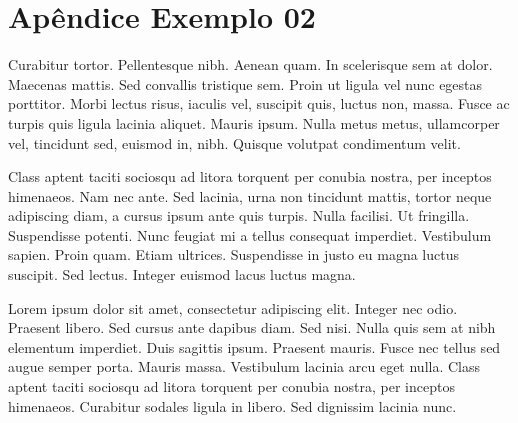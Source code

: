 \chapter{Apêndice Exemplo 02}
\noindent
Curabitur tortor. Pellentesque nibh. Aenean quam. In scelerisque sem at dolor. Maecenas mattis. Sed convallis tristique sem. Proin ut ligula vel nunc egestas porttitor. Morbi lectus risus, iaculis vel, suscipit quis, luctus non, massa. Fusce ac turpis quis ligula lacinia aliquet. Mauris ipsum. Nulla metus metus, ullamcorper vel, tincidunt sed, euismod in, nibh. Quisque volutpat condimentum velit.

Class aptent taciti sociosqu ad litora torquent per conubia nostra, per inceptos himenaeos. Nam nec ante. Sed lacinia, urna non tincidunt mattis, tortor neque adipiscing diam, a cursus ipsum ante quis turpis. Nulla facilisi. Ut fringilla. Suspendisse potenti. Nunc feugiat mi a tellus consequat imperdiet. Vestibulum sapien. Proin quam. Etiam ultrices. Suspendisse in justo eu magna luctus suscipit. Sed lectus. Integer euismod lacus luctus magna.

Lorem ipsum dolor sit amet, consectetur adipiscing elit. Integer nec odio. Praesent libero. Sed cursus ante dapibus diam. Sed nisi. Nulla quis sem at nibh elementum imperdiet. Duis sagittis ipsum. Praesent mauris. Fusce nec tellus sed augue semper porta. Mauris massa. Vestibulum lacinia arcu eget nulla. Class aptent taciti sociosqu ad litora torquent per conubia nostra, per inceptos himenaeos. Curabitur sodales ligula in libero. Sed dignissim lacinia nunc.
